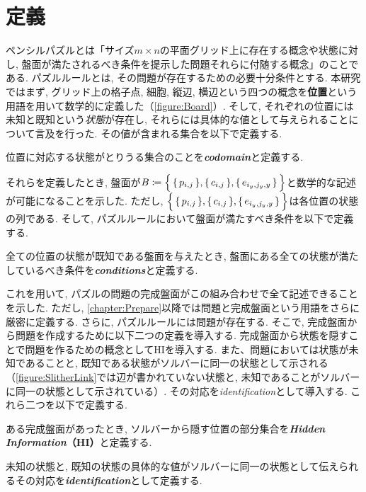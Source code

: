 \section{定義}\label{section:IntroDefinition}
ペンシルパズルとは「サイズ$m\times n$の平面グリッド上に存在する概念や状態に対し, 盤面が満たされるべき条件を提示した問題それらに付随する概念」のことである. パズルルールとは, その問題が存在するための必要十分条件とする. 本研究ではまず, グリッド上の格子点, 細胞, 縦辺, 横辺という四つの概念を\textbf{位置}という用語を用いて数学的に定義した（\cref{figure:Board}）. そして, それぞれの位置には未知と既知という\textit{状態}が存在し, それらには具体的な値として与えられることについて言及を行った. その値が含まれる集合を以下で定義する.
\begin{definition}
	位置に対応する状態がとりうる集合のことを\textbf{\textit{codomain}}と定義する.
\end{definition}
それらを定義したとき, 盤面が$B\coloneqq\Bigl\{\,\{\,p_{i,j}\,\},\{\,c_{i,j}\,\},\{\,e_{i_y,j_y,y}\,\}\,\Bigr\}$と数学的な記述が可能になることを示した. ただし, $\Bigl\{\,\{\,p_{i,j}\,\},\{\,c_{i,j}\,\},\{\,e_{i_y,j_y,y}\,\}\,\Bigr\}$は各位置の状態の列である. そして, パズルルールにおいて盤面が満たすべき条件を以下で定義する.
\begin{definition}
	全ての位置の状態が既知である盤面を与えたとき, 盤面にある全ての状態が満たしているべき条件を\textbf{\textit{conditions}}と定義する.
\end{definition}
これを用いて, パズルの問題の完成盤面がこの組み合わせで全て記述できることを示した. ただし, \cref{chapter:Prepare}以降では問題と完成盤面という用語をさらに厳密に定義する. さらに, パズルルールには問題が存在する. そこで, 完成盤面から問題を作成するために以下二つの定義を導入する. 完成盤面から状態を隠すことで問題を作るための概念としてHIを導入する. また、問題においては状態が未知であることと, 既知である状態がソルバーに同一の状態として示される（\cref{figure:SlitherLink}では辺が書かれていない状態と, 未知であることがソルバーに同一の状態として示されている）. その対応を\textit{identification}として導入する. これら二つを以下で定義する.
\begin{definition}
	ある完成盤面があったとき, ソルバーから隠す位置の部分集合を\textbf{\textit{Hidden Information}（HI）}と定義する.
\end{definition}
\begin{definition}
	未知の状態と, 既知の状態の具体的な値がソルバーに同一の状態として伝えられるその対応を\textbf{\textit{identification}}として定義する.
\end{definition}

